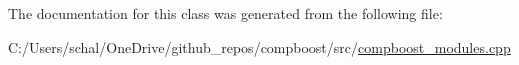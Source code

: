 The documentation for this class was generated from the following file\+:\begin{DoxyCompactItemize}
\item 
C\+:/\+Users/schal/\+One\+Drive/github\+\_\+repos/compboost/src/\mbox{\hyperlink{compboost__modules_8cpp}{compboost\+\_\+modules.\+cpp}}\end{DoxyCompactItemize}
